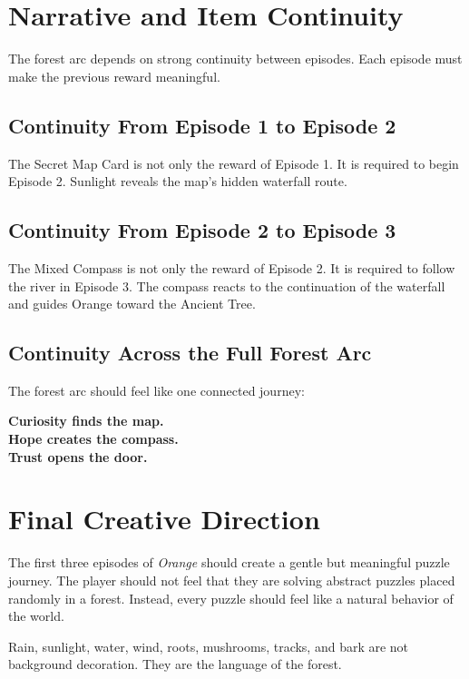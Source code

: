 \documentclass[12pt]{article}
\begin{document}
\section{Narrative and Item Continuity}

The forest arc depends on strong continuity between episodes. Each episode must make the previous reward meaningful.

\subsection{Continuity From Episode 1 to Episode 2}

The Secret Map Card is not only the reward of Episode 1. It is required to begin Episode 2. Sunlight reveals the map's hidden waterfall route.

\subsection{Continuity From Episode 2 to Episode 3}

The Mixed Compass is not only the reward of Episode 2. It is required to follow the river in Episode 3. The compass reacts to the continuation of the waterfall and guides Orange toward the Ancient Tree.

\subsection{Continuity Across the Full Forest Arc}

The forest arc should feel like one connected journey:

\begin{center}
\textbf{Curiosity finds the map.}\\
\textbf{Hope creates the compass.}\\
\textbf{Trust opens the door.}
\end{center}

\section{Final Creative Direction}

The first three episodes of \textit{Orange} should create a gentle but meaningful puzzle journey. The player should not feel that they are solving abstract puzzles placed randomly in a forest. Instead, every puzzle should feel like a natural behavior of the world.

Rain, sunlight, water, wind, roots, mushrooms, tracks, and bark are not background decoration. They are the language of the forest.
\end{document}
